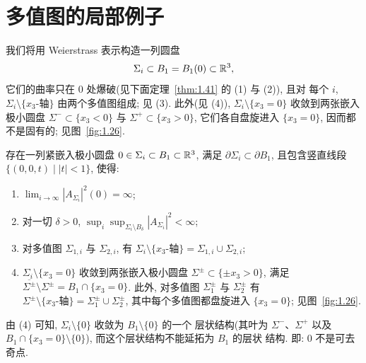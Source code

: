 \section{多值图的局部例子}
\label{sec:1.10}

我们将用 Weierstrass 表示构造一列圆盘
\begin{equation}
\Sigma_i\subset B_1=B_1(0)\subset\mathbb{R}^3,
\label{eq:1.205}
\end{equation}
它们的曲率只在 $0$ 处爆破(见下面定理~\ref{thm:1.41} 的 (1) 与 (2)), 且对
每个 $i$, $\Sigma_i\setminus\{x_3\text{-轴}\}$ 由两个多值图组成; 见 (3).
此外(见 (4)), $\Sigma_i\setminus\{x_3=0\}$ 收敛到两张嵌入极小圆盘
$\Sigma^-\subset\{x_3<0\}$ 与 $\Sigma^+\subset\{x_3>0\}$, 它们各自盘旋进入
$\{x_3=0\}$, 因而都不是固有的; 见图~\ref{fig:1.26}.

\begin{theorem}
\label{thm:1.41}
存在一列紧嵌入极小圆盘 $0\in\Sigma_i\subset B_1\subset\mathbb{R}^3$, 满足
$\partial\Sigma_i\subset\partial B_1$, 且包含竖直线段
$\{(0,0,t)\mid |t|<1\}$, 使得:
\begin{enumerate}
  \item $\lim_{i\to\infty}|A_{\Sigma_i}|^{2}(0)=\infty$;
  \item 对一切 $\delta>0$,
    $\sup_i\sup_{\Sigma_i\setminus B_\delta}|A_{\Sigma_i}|^{2}<\infty$;
  \item 对多值图 $\Sigma_{1,i}$ 与 $\Sigma_{2,i}$, 有
    $\Sigma_i\setminus\{x_3\text{-轴}\}=\Sigma_{1,i}\cup\Sigma_{2,i}$;
  \item $\Sigma_i\setminus\{x_3=0\}$ 收敛到两张嵌入极小圆盘
    $\Sigma^{\pm}\subset\{\pm x_3>0\}$, 满足
    $\overline{\Sigma^{\pm}}\setminus\Sigma^{\pm}
     =B_1\cap\{x_3=0\}$. 此外, 对多值图 $\Sigma_1^{\pm}$ 与
    $\Sigma_2^{\pm}$ 有
    $\Sigma^{\pm}\setminus\{x_3\text{-轴}\}
     =\Sigma_1^{\pm}\cup\Sigma_2^{\pm}$, 其中每个多值图都盘旋进入
    $\{x_3=0\}$; 见图~\ref{fig:1.26}.
\end{enumerate}
\end{theorem}

由 (4) 可知, $\Sigma_i\setminus\{0\}$ 收敛为 $B_1\setminus\{0\}$ 的一个
层状结构(其叶为 $\Sigma^-$、$\Sigma^+$ 以及
$B_1\cap\{x_3=0\}\setminus\{0\}$), 而这个层状结构不能延拓为 $B_1$ 的层状
结构. 即: $0$ 不是可去奇点.


